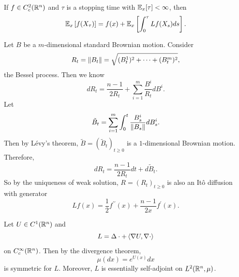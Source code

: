 \begin{thm}
    If $f \in C_c^2(\mathbb{R}^n)$ and $\tau$ is a stopping time with $\mathbb{E}_x[\tau] < \infty$, then
    \begin{equation*}
        \mathbb{E}_x\left[f(X_\tau)\right] = f(x) + \mathbb{E}_x\left[\int_0^\tau Lf(X_s)ds\right].
    \end{equation*}
\end{thm}

\begin{exam}
    Let $B$ be a $m$-dimensional standard Brownian motion. Consider
    \begin{equation*}
        R_t = \left\lVert B_t\right\lVert = \sqrt{(B^1_t)^2 + \cdots + (B^m_t)^2},
    \end{equation*}
    the Bessel process. Then we know
    \begin{equation*}
        dR_t = \frac{n-1}{2R_t} + \sum_{i=1}^m \frac{B^i}{R_t}dB^i.
    \end{equation*}
    Let
    \begin{equation*}
        \tilde{B}_t =  \sum_{i=1}^m \int_0^t \frac{B^i_s}{\left\lVert B_s\right\lVert}dB^i_s.
    \end{equation*}
    Then by L\'evy's theorem, $\tilde{B} = (\tilde{B}_t)_{t \geq 0}$ is a $1$-dimensional Brownian motion. Therefore,
    \begin{equation*}
        dR_t = \frac{n-1}{2R_t}dt + d\tilde{B}_t.
    \end{equation*}
    So by the uniqueness of weak solution, $R=(R_t)_{t \geq 0}$ is also an It\^o diffusion with generator
    \begin{equation*}
        Lf(x) = \frac{1}{2}f^{\prime\prime}(x) + \frac{n-1}{2x}f^\prime(x).
    \end{equation*} 
\end{exam}

\begin{exam}
    Let $U \in C^1(\mathbb{R}^n)$ and 
    \begin{equation*}
        L = \Delta \cdot + \left\langle \nabla U,\nabla \cdot \right\rangle
    \end{equation*}
    on $C^\infty_c(\mathbb{R}^n)$. Then by the divergence theorem,
    \begin{equation*}
        \mu(dx) = e^{U(x)}dx
    \end{equation*}
    is symmetric for $L$. Moreover, $L$ is essentially self-adjoint on $L^2(\mathbb{R}^n,\mu)$.
\end{exam}

